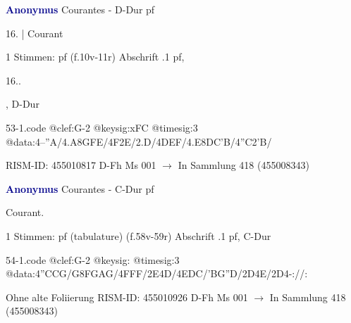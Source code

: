 \documentclass[twocolumn]{book}
\begin{document}
\newline \par \vspace{7pt} \textcolor{darkblue}{\textbf{Anonymus  }}
\newline Courantes - D-Dur
\newline pf
\newline \begin{itshape}[f.10v, at left:] 16. | Courant\end{itshape} 
\newline \textcolor{darkblue}{}  1 Stimmen: pf  (f.10v-11r)
\newline Abschrift
.1  pf, \begin{itshape}16..\end{itshape}, D-Dur  
\begin{filecontents*}{53-1.code}
@clef:G-2
@keysig:xFC
@timesig:3
@data:4--''A/4.A{8GFE}/4F2E/2.D/4DEF/4.E{8DC'B}/4''C2'B/
\end{filecontents*}
\newline
%
\newline RISM-ID: 455010817
\newline D-Fh  Ms 001
\newline $\rightarrow$ In Sammlung 418 (455008343)
      
\newline \par \vspace{7pt} \textcolor{darkblue}{\textbf{Anonymus  }}
\newline Courantes - C-Dur
\newline pf
\newline \begin{itshape}[f.58v, at left:] Courant.\end{itshape} 
\newline \textcolor{darkblue}{}  1 Stimmen: pf (tabulature)  (f.58v-59r)
\newline Abschrift
.1  pf, C-Dur  
\begin{filecontents*}{54-1.code}
@clef:G-2
@keysig:
@timesig:3
@data:4''CCG/G{8FGAG}/4FFF/2E4D/4EDC/'BG''D/2D4E/2D4-://:
\end{filecontents*}
\newline
%
\newline Ohne alte Foliierung
\newline RISM-ID: 455010926
\newline D-Fh  Ms 001
\newline $\rightarrow$ In Sammlung 418 (455008343)
      
\end{document}
